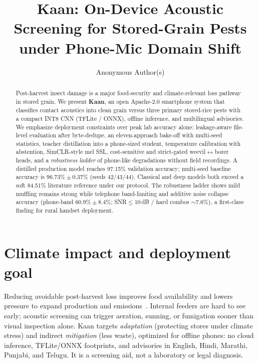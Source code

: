 \documentclass{article}
\title{Kaan: On-Device Acoustic Screening for Stored-Grain Pests\\
under Phone-Mic Domain Shift}
\author{
  Anonymous Author(s)
}
\begin{document}
\maketitle

\begin{abstract}
Post-harvest insect damage is a major food-security and climate-relevant loss pathway in stored grain.
We present \textbf{Kaan}, an open Apache-2.0 smartphone system that classifies contact acoustics into clean grain versus three primary stored-rice pests with a compact INT8 CNN (TFLite / ONNX), offline inference, and multilingual advisories.
We emphasize deployment constraints over peak lab accuracy alone: leakage-aware file-level evaluation after byte-dedupe, an eleven-approach bake-off with multi-seed statistics, teacher distillation into a phone-sized student, temperature calibration with abstention, SimCLR-style mel SSL, cost-sensitive and strict-gated weevil$\leftrightarrow$borer heads, and a \emph{robustness ladder} of phone-like degradations without field recordings.
A distilled production model reaches 97.15\% validation accuracy; multi-seed baseline accuracy is $96.73\%\pm0.37\%$ (seeds 42/43/44).
Classical and deep models both exceed a soft 84.51\% literature reference under our protocol.
The robustness ladder shows mild muffling remains strong while telephone band-limiting and additive noise collapse accuracy (phone-band $60.9\%\pm8.4\%$; SNR$\le10$\,dB / hard combos $\sim7.6\%$), a first-class finding for rural handset deployment.
\end{abstract}

\section{Climate impact and deployment goal}
Reducing avoidable post-harvest loss improves food availability and lowers pressure to expand production and emissions~\cite{igmri2015,worldbank_phl}.
Internal feeders are hard to see early; acoustic screening can trigger aeration, sunning, or fumigation sooner than visual inspection alone.
Kaan targets \emph{adaptation} (protecting stores under climate stress) and indirect \emph{mitigation} (less waste), optimized for offline phones: no cloud inference, TFLite/ONNX footprints, and advisories in English, Hindi, Marathi, Punjabi, and Telugu.
It is a screening aid, not a laboratory or legal diagnosis.
\end{document}
